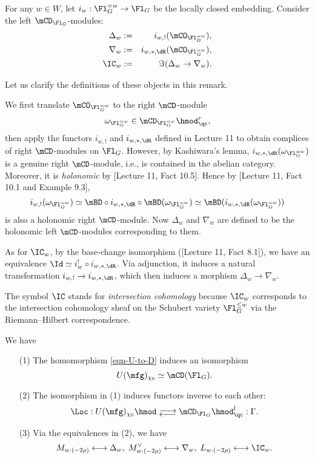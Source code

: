 	\begin{constr}
		For any $w\in W$, let $i_w: \Fl_G^{=w}\to \Fl_G$ be the locally closed embedding. Consider the left $\mCD_{\Fl_G}$-modules:
		\begin{eqnarray*}
			\Delta_w &:=&  i_{w,!}(\mCO_{\Fl_G^{=w}}),\\
			\nabla_w &:=& i_{w,*,\dR}(\mCO_{\Fl_G^{=w}}),\\
			\IC_w &:=& \Im( \Delta_w \to \nabla_w ).
		\end{eqnarray*}
	\end{constr}

	\begin{rem}
		Let us clarify the definitions of these objects in this remark.

		We first translate $\mCO_{\Fl_G^{=w}}$ to the right $\mCD$-module 
		\[
			\omega_{\Fl_G^{=w}} \in \mCD_{\Fl_G^{=w}}\hmod_\qc^r,
		\]
		then apply the functors $i_{w,!}$ and $i_{w,*,\dR}$ defined in Lecture 11 to obtain complices of right $\mCD$-modules on $\Fl_G$. However, by Kashiwara's lemma, $i_{w,*,\dR}(\omega_{\Fl_G^{=w}})$ is a genuine right $\mCD$-module, i.e., is contained in the abelian category. Moreover, it is \emph{holonomic} by [Lecture 11, Fact 10.5]. Hence by [Lecture 11, Fact 10.1 and Example 9.3], 
		\[
			i_{w,!}(\omega_{\Fl_G^{=w}}) \simeq \mBD \circ i_{w,*,\dR} \circ \mBD (\omega_{\Fl_G^{=w}}) \simeq \mBD(i_{w,*,\dR}(\omega_{\Fl_G^{=w}}))
		\]
		is also a holonomic right $\mCD$-module. Now $\Delta_w $ and $\nabla_w $ are defined to be the holonomic left $\mCD$-modules corresponding to them.

		As for $\IC_w$, by the base-change isomorphism ([Lecture 11, Fact 8.1]), we have an equivalence $\Id \simeq i_{w}^! \circ i_{w,*,\dR}$. Via adjunction, it induces a natural transformation $i_{w,!} \to i_{w,*,\dR}$, which then induces a morphism $\Delta_w \to \nabla_w$.
	\end{rem}

	\begin{rem}
		The symbol $\IC$ stands for \emph{intersection cohomology} because $\IC_w$ corresponds to the intersection cohomology sheaf on the Schubert variety $\Fl_G^{\le w}$ via the Riemann--Hilbert correspondence.
	\end{rem}


	\begin{thm}
		\label{thm-localization}
		We have
		\begin{itemize}
			\item[(1)]
				The homomorphism \eqref{eqn-U-to-D} induces an isomorphism
				\[
					U(\mfg)_{\chi_0} \simeq \mCD(\Fl_G).
				\]
			\item[(2)]
				The isomorphism in (1) induces functors inverse to each other:
				\[
					\Loc: U(\mfg)_{\chi_0}\hmod \adj \mCD_{\Fl_G}\hmod_\qc^l : \Gamma.
				\]
			\item[(3)]
				Via the equivalences in (2), we have
				\[
					M_{w\cdot (-2\rho)} \longleftrightarrow \Delta_w,\; M^\vee_{w\cdot (-2\rho)} \longleftrightarrow \nabla_w,\; L_{w\cdot (-2\rho)} \longleftrightarrow \IC_w.
				\]
		\end{itemize}
	\end{thm}

